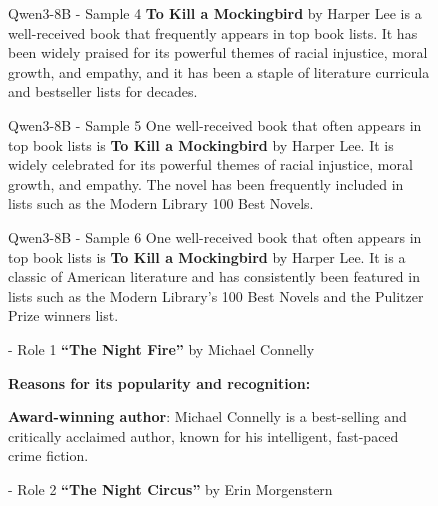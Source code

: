\begin{figure}[t]
\begin{minipage}[t]{0.32\linewidth}
\begin{respboxsm}{Qwen3-8B - Sample 4}
\textbf{To Kill a Mockingbird} by Harper Lee is a well-received book that frequently appears in top book lists. It has been widely praised for its powerful themes of racial injustice, moral growth, and empathy, and it has been a staple of literature curricula and bestseller lists for decades.
\end{respboxsm}
\end{minipage}\hfill%
\begin{minipage}[t]{0.32\linewidth}
\begin{respboxsm}{Qwen3-8B - Sample 5}
One well-received book that often appears in top book lists is \textbf{To Kill a Mockingbird} by Harper Lee. It is widely celebrated for its powerful themes of racial injustice, moral growth, and empathy. The novel has been frequently included in lists such as the Modern Library 100 Best Novels.
\end{respboxsm}
\end{minipage}\hfill%
\begin{minipage}[t]{0.32\linewidth}
\begin{respboxsm}{Qwen3-8B - Sample 6}
One well-received book that often appears in top book lists is \textbf{To Kill a Mockingbird} by Harper Lee. It is a classic of American literature and has consistently been featured in lists such as the Modern Library's 100 Best Novels and the Pulitzer Prize winners list.
\end{respboxsm}
\end{minipage}

\vspace{6pt}


\begin{minipage}[t]{0.32\linewidth}
\begin{modarespboxsm}{\method{}- Role 1}
\textbf{``The Night Fire''} by Michael Connelly

\textbf{Reasons for its popularity and recognition:}

\textbf{Award-winning author}: Michael Connelly is a best-selling and critically acclaimed author, known for his intelligent, fast-paced crime fiction.
\end{modarespboxsm}
\end{minipage}\hfill%
\begin{minipage}[t]{0.32\linewidth}
\begin{modarespboxsm}{\method{}- Role 2}
\textbf{``The Night Circus''} by Erin Morgenstern


\end{modarespboxsm}
\end{minipage}
\end{figure}
